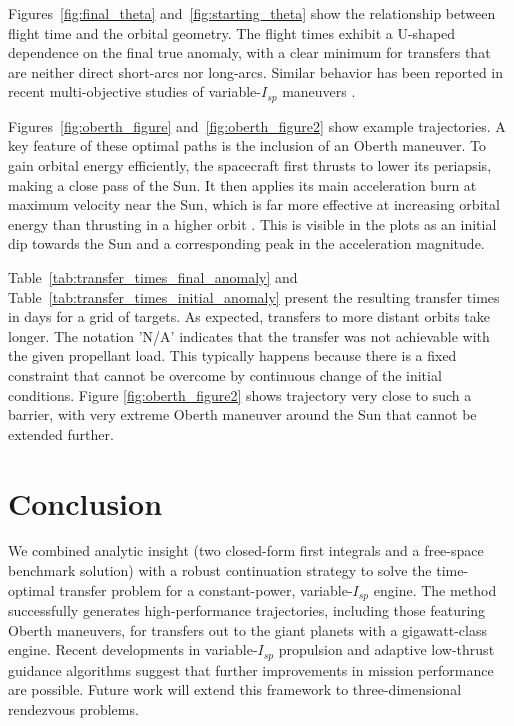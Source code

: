 \documentclass[journal, a4paper]{IEEEtran}
\begin{document}
Figures~\ref{fig:final_theta} and~\ref{fig:starting_theta} show the relationship between flight time and the orbital geometry. The flight times exhibit a U-shaped dependence on the final true anomaly, with a clear minimum for transfers that are neither direct short-arcs nor long-arcs. Similar behavior has been reported in recent multi-objective studies of variable-$I_{\!sp}$ maneuvers \cite{DiPasquale2024}.

Figures~\ref{fig:oberth_figure} and~\ref{fig:oberth_figure2} show example trajectories. A key feature of these optimal paths is the inclusion of an Oberth maneuver. To gain orbital energy efficiently, the spacecraft first thrusts to lower its periapsis, making a close pass of the Sun. It then applies its main acceleration burn at maximum velocity near the Sun, which is far more effective at increasing orbital energy than thrusting in a higher orbit \cite{Oberth1923}. This is visible in the plots as an initial dip towards the Sun and a corresponding peak in the acceleration magnitude.

Table~\ref{tab:transfer_times_final_anomaly} and Table~\ref{tab:transfer_times_initial_anomaly} present the resulting transfer times in days for a grid of targets. As expected, transfers to more distant orbits take longer. The notation 'N/A' indicates that the transfer was not achievable with the given propellant load. This typically happens because there is a fixed constraint that cannot be overcome by continuous change of the initial conditions. Figure \ref{fig:oberth_figure2} shows trajectory  very close to such a barrier, with very extreme Oberth maneuver around the Sun that cannot be extended further. 


\section{Conclusion}
We combined analytic insight (two closed-form first integrals and a free-space benchmark solution) with a robust continuation strategy to solve the time-optimal transfer problem for a constant-power, variable-$I_{\!sp}$ engine. The method successfully generates high-performance trajectories, including those featuring Oberth maneuvers, for transfers out to the giant planets with a gigawatt-class engine. Recent developments in variable-$I_{\!sp}$ propulsion and adaptive low-thrust guidance algorithms \cite{PinoHowell2020,DiPasquale2024} suggest that further improvements in mission performance are possible. Future work will extend this framework to three-dimensional rendezvous problems.
\end{document}
